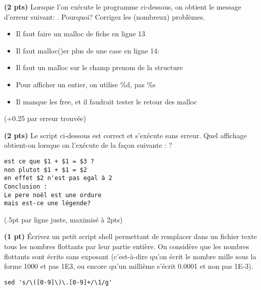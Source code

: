 \documentclass[10pt]{article}
\begin{document}
\begin{Exercice} \textbf{(2 pts)} Lorsque l'on exécute le programme ci-dessous,
  on obtient le message d'erreur suivant: . Pourquoi? Corrigez les (nombreux) problèmes.

  \noindent
  \begin{minipage}{.5\linewidth}   
  \end{minipage}

  \begin{Reponse}
    \begin{itemize}
    \item Il faut faire un malloc de fiche en ligne 13
    \item Il faut malloc()er plus de une case en ligne 14:
    \item Il faut un malloc sur le champ prenom de la structure
    \item Pour afficher un entier, on utilise \%d, pas \%s
    \item Il manque les free, et il faudrait tester le retour des malloc
    \end{itemize}

    (+0.25 par erreur trouvée)
  \end{Reponse}
\end{Exercice}

\begin{Exercice} \textbf{(2 pts)} Le script ci-dessous est correct et s'exécute
  sans erreur.  Quel affichage obtient-on lorsque on 
  l'exécute de la façon suivante :  ?

  \begin{Reponse}
    \begin{Verbatim}
est ce que $1 + $1 = $3 ?
non plutot $1 + $1 = $2
en effet $2 n'est pas egal à 2
Conclusion :
Le pere noël est une ordure
mais est-ce une légende?      
    \end{Verbatim}
    (.5pt par ligne juste, maximisé à 2pts)
  \end{Reponse}
\end{Exercice}

\begin{Exercice}\textbf{(1 pt)}
  Écrivez un petit script shell permettant de remplacer dans un fichier texte
  tous les nombres flottants par leur partie entière. On considère que les
  nombres flottants sont écrits sans exposant (c'est-à-dire qu'on écrit le
  nombre mille sous la forme 1000 et pas 1E3, ou encore qu'un millième s'écrit
  0.0001 et non pas 1E-3).

  \begin{Reponse}
    \begin{Verbatim}
sed 's/\([0-9]\)\.[0-9]+/\1/g'      
    \end{Verbatim}
  \end{Reponse}
\end{Exercice}
\end{document}
